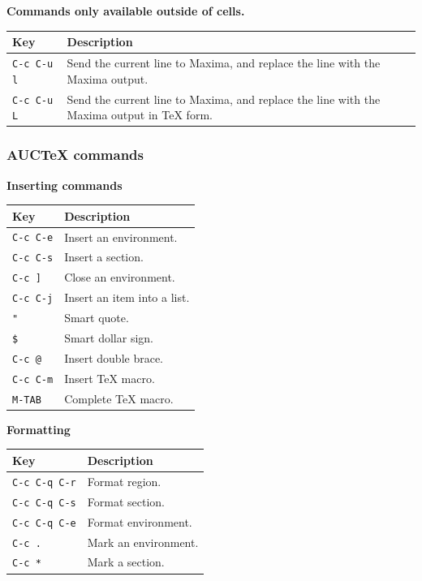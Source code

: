 \smallskip

\noindent
\textbf{Commands only available outside of cells.}

\smallskip

\noindent
\begin{tabular}{p{\firstcol}p{\secondcol}}
\hline
\textbf{Key} & \textbf{Description}\\
\hline
\texttt{C-c C-u l}
& Send the current line to Maxima, and replace the line with the
Maxima output.\\
\texttt{C-c C-u L}
& Send the current line to Maxima, and replace the line with the
Maxima output in \TeX{} form.
\end{tabular}

\subsubsection{AUC\TeX{} commands}

\smallskip

\noindent
\textbf{Inserting commands}

\smallskip

\noindent
\begin{tabular}{p{\firstcol}p{\secondcol}}
\hline
\textbf{Key} & \textbf{Description}\\
\hline
\texttt{C-c C-e}
& Insert an environment.\\
\texttt{C-c C-s}
& Insert a section.\\
\texttt{C-c ]}
& Close an environment.\\
\texttt{C-c C-j}
& Insert an item into a list.\\
\texttt{"}
& Smart quote.\\
\texttt{\$}
& Smart dollar sign.\\
\texttt{C-c @}
& Insert double brace.\\
\texttt{C-c C-m}
& Insert \TeX{} macro.\\
\texttt{M-TAB}
& Complete \TeX{} macro.\\
\end{tabular}

\smallskip

\noindent
\textbf{Formatting}

\smallskip

\noindent
\begin{tabular}{p{\firstcol}p{\secondcol}}
\hline
\textbf{Key} & \textbf{Description}\\
\hline
\texttt{C-c C-q C-r}
& Format region.\\
\texttt{C-c C-q C-s}
& Format section.\\
\texttt{C-c C-q C-e}
& Format environment.\\
\texttt{C-c .}
& Mark an environment.\\
\texttt{C-c *}
& Mark a section.
\end{tabular}

